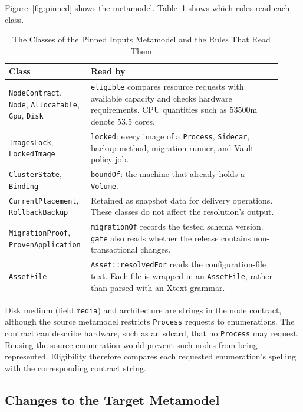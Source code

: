 Figure~\ref{fig:pinned} shows the metamodel. Table~\ref{tab:pinned} shows
which rules read each class.



\begin{table}[!htbp]
\centering
\begin{tabular}{>{\raggedright\arraybackslash}p{0.24\linewidth}>{\raggedright\arraybackslash}p{0.68\linewidth}}
\hline
\textbf{Class} & \textbf{Read by} \\
\hline
\texttt{NodeContract}, \texttt{Node}, \texttt{Allocatable}, \texttt{Gpu}, \texttt{Disk} & \texttt{eligible} compares resource requests with available capacity and checks hardware requirements. CPU quantities such as 53500m denote 53.5 cores. \\
\texttt{ImagesLock}, \texttt{LockedImage} & \texttt{locked}: every image of a \texttt{Process}, \texttt{Sidecar}, backup method, migration runner, and Vault policy job. \\
\texttt{ClusterState}, \texttt{Binding} & \texttt{boundOf}: the machine that already holds a \texttt{Volume}. \\
\texttt{CurrentPlacement}, \texttt{RollbackBackup} & Retained as snapshot data for delivery operations. These classes do not affect the resolution's output. \\
\texttt{MigrationProof}, \texttt{ProvenApplication} & \texttt{migrationOf} records the tested schema version. \texttt{gate} also reads whether the release contains non-transactional changes. \\
\texttt{AssetFile} & \texttt{Asset::resolvedFor} reads the configuration-file text. Each file is wrapped in an \texttt{AssetFile}, rather than parsed with an Xtext grammar. \\
\hline
\end{tabular}
\caption{The Classes of the Pinned Inputs Metamodel and the Rules That Read Them}
\label{tab:pinned}
\end{table}

Disk medium (field \texttt{media}) and architecture are strings in the node contract, although
the source metamodel restricts \texttt{Process} requests to enumerations.
The contract can describe hardware, such as an sdcard, that no
\texttt{Process} may request. Reusing the source enumeration would prevent
such nodes from being represented. Eligibility therefore compares each
requested enumeration's spelling with the corresponding contract string.

\subsection{Changes to the Target Metamodel}
\label{app:target}


